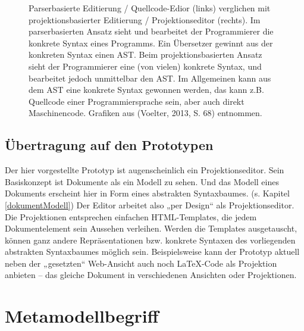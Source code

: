  
\begin{figure}[h!]
\centering
\advance\leftskip-2.5cm
\caption[Parserbasierte versus projektionsbasierte Editierung]{ Parserbasierte Editierung / Quellcode-Edior (links) verglichen mit projektionsbasierter Editierung / Projektionseditor (rechts). Im parserbasierten Ansatz sieht und bearbeitet der Programmierer die konkrete Syntax eines Programms. Ein Übersetzer gewinnt aus der konkreten Syntax einen AST. Beim projektionsbasierten Ansatz sieht der Programmierer eine (von vielen) konkrete Syntax, und bearbeitet jedoch unmittelbar den AST. Im Allgemeinen kann aus dem AST eine konkrete Syntax gewonnen werden, das kann z.B. Quellcode einer Programmiersprache sein, aber auch direkt Maschinencode. Grafiken aus (Voelter, 2013, S. 68) entnommen. }\label{parserprojectional}
\end{figure}
 
\subsection{Übertragung auf den Prototypen}\label{}
 
Der hier vorgestellte Prototyp ist augenscheinlich ein Projektionseditor. Sein Basiskonzept ist Dokumente als ein Modell zu sehen. Und das Modell eines Dokuments erscheint hier in Form eines abstrakten Syntaxbaumes. (s. Kapitel \ref{dokumentModell}) Der Editor arbeitet also „per Design“ als Projektionseditor. Die Projektionen entsprechen einfachen HTML-Templates, die jedem Dokumentelement sein Aussehen verleihen. Werden die Templates ausgetauscht, können ganz andere Repräsentationen bzw. konkrete Syntaxen des vorliegenden abstrakten Syntaxbaumes möglich sein. Beispielsweise kann der Prototyp aktuell neben der „gesetzten“ Web-Ansicht auch noch LaTeX-Code als Projektion anbieten -- das gleiche Dokument in verschiedenen Ansichten oder Projektionen.

 
\section{Metamodellbegriff}\label{metamodellbegriff-sec}
 
